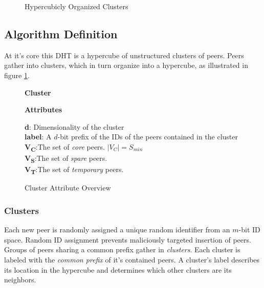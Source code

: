 \documentclass[apa6]{IEEEtran}
\theoremstyle{plain}
\begin{document}
	    \begin{figure}[H]
		    \hspace*{-0.05\linewidth}
		    \centering
			
		    \captionsetup{}
		    \caption{Hypercubicly Organized Clusters}
		    \label{fig:CLUSTERS}
	    \end{figure}
	\subsection{Algorithm Definition}
		At it's core this DHT is a hypercube of unstructured clusters of peers. 
		Peers gather into clusters, which in turn organize into a hypercube, as illustrated in figure \ref{fig:CLUSTERS}.
		
			    \begin{figure}[H]
					\begin{lrbox}{\mybox}
					\hspace*{-0.8cm}
					\begin{minipage}{0.91\columnwidth}
				   		\textbf{\large{Cluster}}
						\begin{addmargin}[1em]{0em}
							\textbf{Attributes}
							\begin{addmargin}[1em]{0em}
								\textbf{d}: Dimensionality of the cluster\\
								\textbf{label}: A $d$-bit prefix of the IDs of the peers contained in the cluster\\
								\textbf{V\textsubscript{C}}:The set of \textit{core} peers. $|V_C| = S_{min}$\\
								\textbf{V\textsubscript{S}}:The set of \textit{spare} peers.\\
								\textbf{V\textsubscript{T}}:The set of \textit{temporary} peers.\\
								
							\end{addmargin}
						\end{addmargin}
					\end{minipage}
					\end{lrbox}
					\framebox[\columnwidth]{\hspace*{15pt}\usebox\mybox\par}
					\caption{Cluster Attribute Overview}
				    \label{fig:CLUSTERDEF}
			    \end{figure}

		\subsubsection{Clusters}
			Each new peer is randomly assigned a unique random identifier from an $m$-bit ID space. 
			Random ID assignment prevents maliciously targeted insertion of peers.
			Groups of peers sharing a common prefix gather in \textit{clusters}.
			Each cluster is labeled with the \textit{common prefix} of it's contained peers.
			A cluster's label describes its location in the hypercube and determines which other clusters are its neighbors. 
			
\end{document}
